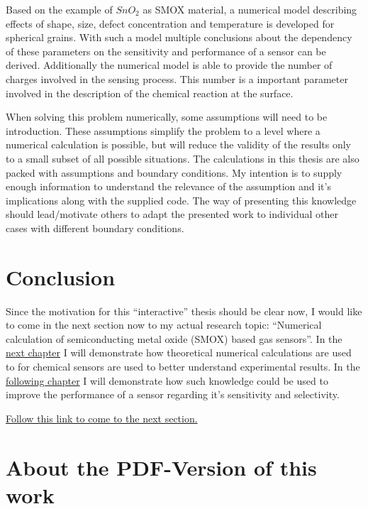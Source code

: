 \documentclass[11pt]{article}
\begin{document}
Based on the example of \(SnO_2\) as SMOX material, a numerical model
describing effects of shape, size, defect concentration and temperature
is developed for spherical grains. With such a model multiple
conclusions about the dependency of these parameters on the sensitivity
and performance of a sensor can be derived. Additionally the numerical
model is able to provide the number of charges involved in the sensing
process. This number is a important parameter involved in the
description of the chemical reaction at the surface.

When solving this problem numerically, some assumptions will need to be
introduction. These assumptions simplify the problem to a level where a
numerical calculation is possible, but will reduce the validity of the
results only to a small subset of all possible situations. The
calculations in this thesis are also packed with assumptions and
boundary conditions. My intention is to supply enough information to
understand the relevance of the assumption and it's implications along
with the supplied code. The way of presenting this knowledge should
lead/motivate others to adapt the presented work to individual other
cases with different boundary conditions.

    \hypertarget{conclusion}{%
\section{Conclusion}\label{conclusion}}

Since the motivation for this ``interactive'' thesis should be clear
now, I would like to come in the next section now to my actual research
topic: ``Numerical calculation of semiconducting metal oxide (SMOX)
based gas sensors''. In the \href{2-Grain-SMOX.ipynb}{next chapter} I
will demonstrate how theoretical numerical calculations are used to for
chemical sensors are used to better understand experimental results. In
the \href{3-Applying_theorie-to-practice.ipynb}{following chapter} I
will demonstrate how such knowledge could be used to improve the
performance of a sensor regarding it's sensitivity and selectivity.

\href{2-Grain-SMOX.ipynb}{Follow this link to come to the next section.}

    \hypertarget{about-the-pdf-version-of-this-work}{%
\section{About the PDF-Version of this
work}\label{about-the-pdf-version-of-this-work}}
\end{document}
